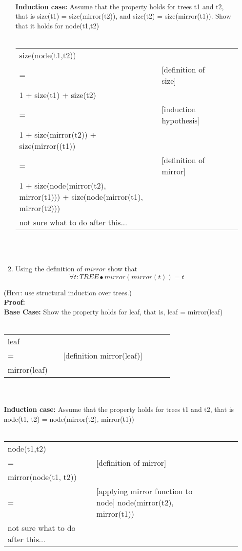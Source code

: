\documentclass{article}
\begin{document}
\begin{enumerate}[\bf I.]
\begin{enumerate}
\\
\textbf{Induction case:} Assume that the property holds for trees t1 and t2, that is size(t1) = size(mirror(t2)), and size(t2) = size(mirror(t1)). Show that it holds for node(t1,t2) \\
\\
\begin{tabular}{l ll lll}
     size(node(t1,t2)) &    &  \\
     = &   & [definition of size] \\
     1 + size(t1) + size(t2) & & \\
     = &   & [induction hypothesis] \\
     1 + size(mirror(t2)) + size(mirror((t1)) & & \\
     = & & [definition of mirror] \\
     1 + size(node(mirror(t2), mirror(t1))) + size(node(mirror(t1), mirror(t2))) & & \\
     not sure what to do after this... \\
\end{tabular} \\
\\

\item Using the definition of $mirror$ show that
\[\forall t: TREE \bullet mirror(mirror(t)) = t\]
\end{enumerate}
(\textsc{Hint}: use structural induction over trees.)
\\
\textbf{Proof:}\\
\textbf{Base Case:} Show the property holds for leaf, that is, leaf = mirror(leaf) \\
\\
\begin{tabular}{l ll lll}
     leaf &    &  \\
     = &   & [definition mirror(leaf)] \\
     mirror(leaf) & &  \\
\end{tabular} \\
\\
\textbf{Induction case:} Assume that the property holds for trees t1 and t2, that is node(t1, t2) = node(mirror(t2), mirror(t1)) \\
\\
\begin{tabular}{l ll lll}
     node(t1,t2) &    &  \\
     = &   & [definition of mirror] \\
     mirror(node(t1, t2)) & & \\
     = &   & [applying mirror function to node] 
     node(mirror(t2), mirror(t1)) & & \\
     not sure what to do after this... \\
\end{tabular} \\
\\

\end{enumerate}
\end{document}
